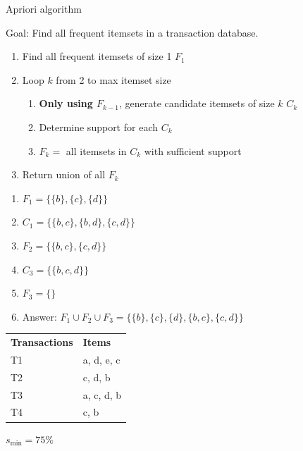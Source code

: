 \begin{theorem}
    {Apriori algorithm}

    Goal: Find all frequent itemsets in a transaction database.

    \begin{enumerate}
        \item Find all frequent itemsets of size 1 $F_1$
        \item Loop $k$ from 2 to max itemset size
              \begin{enumerate}
                  \item \textbf{Only using $F_{k-1}$}, generate candidate itemsets of size $k$ $C_k$
                  \item Determine support for each $C_k$
                  \item $F_k = $ all itemsets in $C_k$ with sufficient support
              \end{enumerate}
        \item Return union of all $F_k$
    \end{enumerate}

    \tcblower

    \begin{minipage}{0.65\textwidth}
        \begin{enumerate}
            \item $F_1 = \{\{b\}, \{c\}, \{d\}\}$
            \item $C_1 = \{\{b, c\}, \{b, d\}, \{c, d\}\}$
            \item $F_2 = \{\{b, c\}, \{c, d\}\}$
            \item $C_3 = \{\{b, c, d\}\}$
            \item $F_3 = \{\}$
            \item Answer: $F_1 \cup F_2 \cup F_3 = \{\{b\}, \{c\}, \{d\}, \{b, c\}, \{c, d\}\}$
        \end{enumerate}

    \end{minipage}
    \hfill
    \begin{minipage}{0.3\textwidth}
        \begin{tabular}{l|l}
            \textbf{Transactions} & \textbf{Items} \\
            T1                    & a, d, e, c     \\
            T2                    & c, d, b        \\
            T3                    & a, c, d, b     \\
            T4                    & c, b           \\
        \end{tabular}

        $s_\text{min} = 75\%$
    \end{minipage}

\end{theorem}